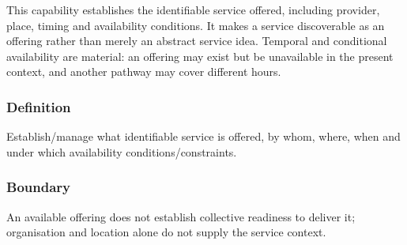 This capability establishes the identifiable service offered, including provider, place, timing and availability conditions. It makes a service discoverable as an offering rather than merely an abstract service idea. Temporal and conditional availability are material: an offering may exist but be unavailable in the present context, and another pathway may cover different hours.

\subsubsection*{Definition}

Establish/\allowbreak{}manage what identifiable service is offered, by whom, where, when and under which availability conditions/\allowbreak{}constraints.

\subsubsection*{Boundary}

An available offering does not establish collective readiness to deliver it; organisation and location alone do not supply the service context.

